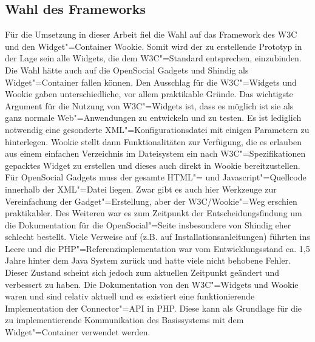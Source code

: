\subsection{Wahl des Frameworks}
Für die Umsetzung in dieser Arbeit fiel die Wahl auf das Framework des \ac{W3C} und den Widget"=Container Wookie. Somit wird der zu erstellende Prototyp in der Lage sein alle Widgets, die dem \ac{W3C}"=Standard entsprechen, einzubinden. Die Wahl hätte auch auf die OpenSocial Gadgets und Shindig als Widget"=Container fallen können. Den Ausschlag für die \ac{W3C}"=Widgets und Wookie gaben unterschiedliche, vor allem praktikable Gründe. Das wichtigste Argument für die Nutzung von \ac{W3C}"=Widgets ist, dass es möglich ist sie als ganz normale Web"=Anwendungen zu entwickeln und zu testen. Es ist lediglich notwendig eine gesonderte \ac{XML}"=Konfigurationsdatei mit einigen Parametern zu hinterlegen. Wookie stellt dann Funktionalitäten zur Verfügung, die es erlauben aus einem einfachen Verzeichnis im Dateisystem ein nach \ac{W3C}"=Spezifikationen gepacktes Widget zu erstellen und dieses auch direkt in Wookie bereitzustellen. Für OpenSocial Gadgets muss der gesamte \ac{HTML}"= und Javascript"=Quellcode innerhalb der \ac{XML}"=Datei liegen. Zwar gibt es auch hier Werkzeuge zur Vereinfachung der Gadget"=Erstellung, aber der \ac{W3C}/Wookie"=Weg erschien praktikabler. Des Weiteren war es zum Zeitpunkt der Entscheidungsfindung um die Dokumentation für die OpenSocial"=Seite insbesondere von Shindig eher schlecht bestellt. Viele Verweise auf (z.B. auf Installationsanleitungen) führten ins Leere und die PHP"=Referenzimplementation war vom Entwicklungsstand ca. 1,5 Jahre hinter dem Java System zurück und hatte viele nicht behobene Fehler. Dieser Zustand scheint sich jedoch zum aktuellen Zeitpunkt geändert und verbessert zu haben. Die Dokumentation von den \ac{W3C}"=Widgets und Wookie waren und sind relativ aktuell und es existiert eine funktionierende Implementation der Connector"=\ac{API} in PHP. Diese kann als Grundlage für die zu implementierende Kommunikation des Basissystems mit dem Widget"=Container verwendet werden.

